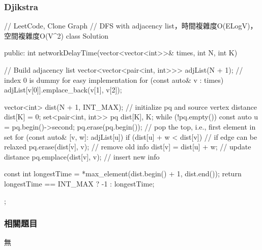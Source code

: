 \subsubsection{Djikstra}
\begin{Code}
// LeetCode, Clone Graph
// DFS with adjacency list，時間複雜度O(ELogV)，空間複雜度O(V^2)
class Solution {
public:
    int networkDelayTime(vector<vector<int>>& times, int N, int K)
    {
        // Build adjacency list
        vector<vector<pair<int, int>>> adjList(N + 1); // index 0 is dummy for easy implementation
        for (const auto& v : times)
            adjList[v[0]].emplace_back(v[1], v[2]);

        vector<int> dist(N + 1, INT_MAX);
        // initialize pq and source vertex distance
        dist[K] = 0;
        set<pair<int, int>> pq {{dist[K], K}};
        while (!pq.empty()) {
            const auto u = pq.begin()->second;
            pq.erase(pq.begin()); // pop the top, i.e., first element in set
            for (const auto& [v, w]: adjList[u]) {
                if (dist[u] + w < dist[v]) { // if edge can be relaxed
                    pq.erase({dist[v], v}); // remove old info
                    dist[v] = dist[u] + w;  // update distance
                    pq.emplace(dist[v], v); // insert new info
                }
            }
        }

        const int longestTime = *max_element(dist.begin() + 1, dist.end());
        return longestTime == INT_MAX ? -1 : longestTime;
    }
};
\end{Code}

\subsubsection{相關題目}
\begindot
\item 無
\myenddot
